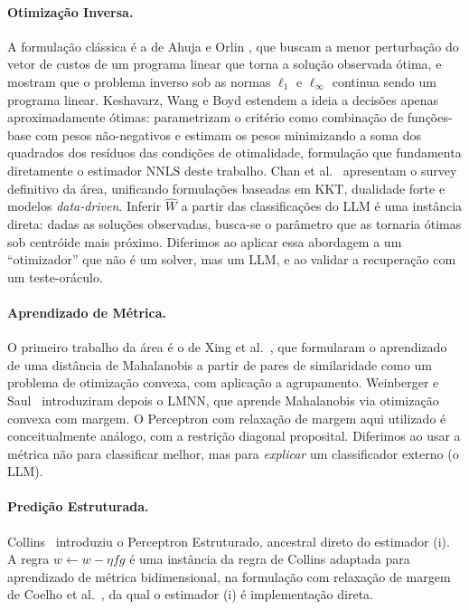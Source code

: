 \documentclass[12pt,a4paper]{article}
\newcommand{\West}{\ensuremath{\hat{W}}}   %
\begin{document}
\paragraph{Otimização Inversa.}
A formulação clássica é a de Ahuja e Orlin \cite{ahujaInverseOptimization2001}, que buscam
a menor perturbação do vetor de custos de um programa linear que torna a solução observada
ótima, e mostram que o problema inverso sob as normas $\ell_1$ e $\ell_\infty$ continua
sendo um programa linear. Keshavarz, Wang e Boyd \cite{keshavarzImputingConvex2011}
estendem a ideia a decisões apenas aproximadamente ótimas: parametrizam o critério como
combinação de funções-base com pesos não-negativos e estimam os pesos minimizando a soma
dos quadrados dos resíduos das condições de otimalidade, formulação que fundamenta
diretamente o estimador NNLS deste trabalho. Chan et
al.~\cite{chanInverseOptimization2025} apresentam o survey definitivo da área,
unificando formulações baseadas em KKT, dualidade forte e modelos \emph{data-driven}. Inferir
\West{} a partir das classificações do LLM é uma instância direta: dadas as soluções
observadas, busca-se o parâmetro que as tornaria ótimas sob centróide mais próximo. Diferimos
ao aplicar essa abordagem a um ``otimizador'' que não é um solver, mas um LLM, e ao
validar a recuperação com um teste-oráculo.

\paragraph{Aprendizado de Métrica.}
O primeiro trabalho da área é o de Xing et al.~\cite{xingDistanceMetric2002}, que
formularam o aprendizado de uma distância de Mahalanobis a partir de pares de
similaridade como um problema de otimização convexa, com aplicação a agrupamento.
Weinberger e Saul~\cite{weinbergerDistanceMetric2009} introduziram depois o LMNN, que
aprende
Mahalanobis via otimização convexa com margem. O Perceptron com relaxação de margem aqui
utilizado é
conceitualmente análogo, com a restrição diagonal proposital. Diferimos ao usar a métrica
não para classificar melhor, mas para \emph{explicar} um classificador externo (o LLM).

\paragraph{Predição Estruturada.}
Collins~\cite{collinsDiscriminativeTraining2002} introduziu o Perceptron Estruturado,
ancestral direto do estimador (i). A regra $w \leftarrow w - \eta f g$ é uma instância da
regra de Collins adaptada para aprendizado de métrica bidimensional, na formulação com
relaxação de margem de Coelho et al.~\cite{coelhoPredicaoEstruturada2017}, da qual o
estimador (i) é implementação direta.
\end{document}
